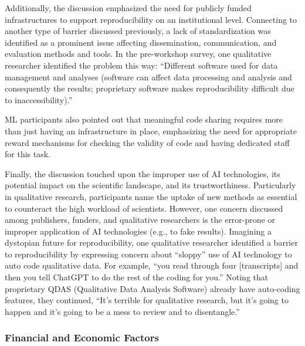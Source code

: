 \documentclass[authordate, meta]{jote-new-article}
\begin{document}
	Additionally, the discussion emphasized the need for publicly funded infrastructures to support reproducibility on an institutional level. Connecting to another type of barrier discussed previously, a lack of standardization was identified as a prominent issue affecting dissemination, communication, and evaluation methods and tools. In the pre-workshop survey, one qualitative researcher identified the problem this way: “Different software used for data management and analyses (software can affect data processing and analysis and consequently the results; proprietary software makes reproducibility difficult due to inaccessibility).”







	ML participants also pointed out that meaningful code sharing requires more than just having an infrastructure in place, emphasizing the need for appropriate reward mechanisms for checking the validity of code and having dedicated staff for this task.







	Finally, the discussion touched upon the improper use of AI technologies, its potential impact on the scientific landscape, and its trustworthiness. Particularly in qualitative research, participants name the uptake of new methods as essential to counteract the high workload of scientists. However, one concern discussed among publishers, funders, and qualitative researchers is the error-prone or improper application of AI technologies (e.g., to fake results).   Imagining a dystopian future for reproducibility, one qualitative researcher identified a barrier to reproducibility by expressing concern about “sloppy” use of AI technology to auto code qualitative data. For example, “you read through four [transcripts] and then you tell ChatGPT to do the rest of the coding for you.” Noting that proprietary QDAS (Qualitative Data Analysis Software) already have auto-coding features, they continued, “It's terrible for qualitative research, but it's going to happen and it's going to be a mess to review and to disentangle.”











	\subsubsection{Financial and Economic Factors}
\end{document}
